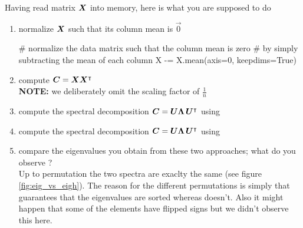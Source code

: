 Having read matrix $\bm{X}$ into memory, here is what you are supposed to do
\begin{enumerate}
\item normalize $\bm{X}$ such that its column mean is $\vec{0}$
\begin{python}
# normalize the data matrix such that the column mean is zero
# by simply subtracting the mean of each column
X -= X.mean(axis=0, keepdims=True)
\end{python}
\item compute $\bm{C} = \bm{X} \bm{X}^\intercal$ \\ \textbf{NOTE:} we deliberately omit the scaling factor of $\frac{1}{n}$
\item compute the spectral decomposition $\bm{C} = \bm{U} \bm{\Lambda} \,\bm{U}^\intercal$ using 
\item compute the spectral decomposition $\bm{C} = \bm{U} \bm{\Lambda} \,\bm{U}^\intercal$ using 
\item compare the eigenvalues you obtain from these two approaches; what do you observe ?
\color{blue} \\[1ex]
Up to permutation the two spectra are exaclty the same (see figure \ref{fig:eig_vs_eigh}). The reason for the different permutations is simply that  guarantees that the eigenvalues are sorted whereas  doesn't. Also it might happen that some of the elements have flipped signs but we didn't observe this here.


\end{enumerate}
